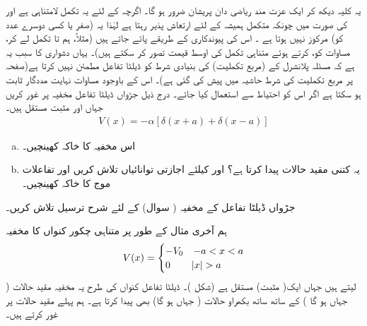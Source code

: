   یہ کلیہ دیکھ کر  ایک   عزت مند ریاضی دان  پریشان  ضرور ہو گا۔   اگرچہ   کے لئے  یہ تکمل  لامتناہی ہے اور  کی صورت میں چونکہ  متکمل ہمیشہ کے لئے ارتعاش پذیر رہتا ہے لہٰذا یہ  (صفر  یا  کسی دوسرے عدد  کو)  مرکوز نہیں ہوتا ہے  ۔ اس کی پیوندکاری  کے طریقے پائے جاتے ہیں  (مثلاً،  ہم  تا    تکمل لے کر،     مساوات  کو،     کرتے ہوئے  متناہی تکمل  کی اوسط قیمت تصور کر سکتے ہیں)۔ یہاں دشواری کا سبب یہ ہے کہ  مسئلہ   پلانشرل کے (مربع تکملیت) کی   بنیادی شرط   کو  ڈیلٹا تفاعل مطمئن  نہیں کرتا ہے(صفحہ  پر مربع تکملیت کی شرط حاشیہ میں پیش کی گئی ہے)۔   اس کے باوجود  مساوات  نہایت مددگار ثابت ہو سکتا ہے اگر اس کو احتیاط سے استعمال کیا جائے۔
درج ذیل جڑواں ڈیلٹا تفاعل مخفیہ  پر غور کریں جہاں  اور   مثبت مستقل  ہیں۔
\begin{align*}
V(x)=-\alpha[\delta(x+a)+\delta(x-a)]
\end{align*}
\begin{enumerate}[a.]
\item
 اس مخفیہ کا خاکہ کھینچیں۔
\item
  یہ کتنی مقید حالات پیدا کرتا ہے؟  اور کیلئے اجازتی توانائیاں تلاش کریں اور تفاعلات موج کا خاکہ کھینچیں۔
\end{enumerate}
جڑواں ڈیلٹا تفاعل کے مخفیہ ( سوال) کے لئے  شرح ترسیل تلاش کریں۔ 

 ہم آخری مثال کے طور پر متناہی چکور  کنواں  کا مخفیہ
\begin{align}\label{مساوات_شروڈنگر_متناہی_چکور_کنواں_مخفیہ}
V(x)=
 \begin{cases} 
     -V_{0} & -a< x< a \\
      0 & \abs{x}> a
   \end{cases}
\end{align}
لیتے ہیں جہاں ایک( مثبت) مستقل ہے (شکل   )۔  ڈیلٹا تفاعل کنواں کی طرح یہ مخفیہ  مقید حالات ( جہاں  ہو گا )  کے ساتھ ساتھ بکھراو  حالات ( جہاں ہو گا) بھی پیدا  کرتا ہے۔ ہم پہلے مقید حالات پر غور کرتے ہیں۔
 
